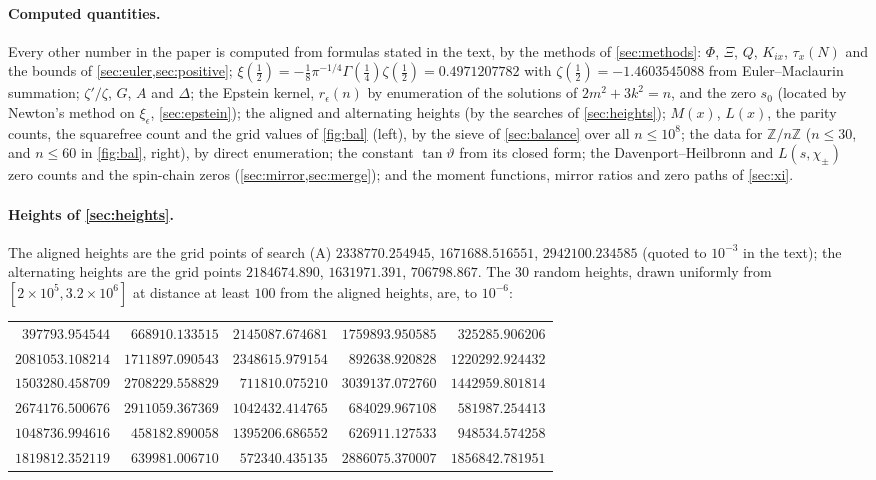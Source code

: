 \documentclass[11pt]{article}
\theoremstyle{definition}\newtheorem{definition}[theorem]{Definition}
\theoremstyle{remark}\newtheorem{remark}[theorem]{Remark}
\begin{document}
\paragraph{Computed quantities.} Every other number in the paper is computed from formulas stated in the text, by the methods of \cref{sec:methods}: $\Phi$, $\Xi$, $Q$, $K_{ix}$, $\tau_x(N)$ and the bounds of \cref{sec:euler,sec:positive}; $\xi(\frac12)=-\frac18\pi^{-1/4}\Gamma(\frac14)\zeta(\frac12)=0.4971207782$ with $\zeta(\frac12)=-1.4603545088$ from Euler--Maclaurin summation; $\zeta'/\zeta$, $G$, $A$ and $\Delta$; the Epstein kernel, $r_\epsilon(n)$ by enumeration of the solutions of $2m^2+3k^2=n$, and the zero $s_0$ (located by Newton's method on $\xi_\epsilon$, \cref{sec:epstein}); the aligned and alternating heights (by the searches of \cref{sec:heights}); $M(x)$, $L(x)$, the parity counts, the squarefree count and the grid values of \cref{fig:bal} (left), by the sieve of \cref{sec:balance} over all $n\le10^8$; the data for $\mathbb Z/n\mathbb Z$ ($n\le30$, and $n\le60$ in \cref{fig:bal}, right), by direct enumeration; the constant $\tan\vartheta$ from its closed form; the Davenport--Heilbronn and $L(s,\chi_{\pm})$ zero counts and the spin-chain zeros (\cref{sec:mirror,sec:merge}); and the moment functions, mirror ratios and zero paths of \cref{sec:xi}.

\paragraph{Heights of \cref{sec:heights}.} The aligned heights are the grid points of search (A) $2338770.254945$, $1671688.516551$, $2942100.234585$ (quoted to $10^{-3}$ in the text); the alternating heights are the grid points $2184674.890$, $1631971.391$, $706798.867$. The 30 random heights, drawn uniformly from $[2\times10^5,3.2\times10^6]$ at distance at least $100$ from the aligned heights, are, to $10^{-6}$:
\begin{center}\small
\begin{tabular}{@{}rrrrr@{}}
$397793.954544$ & $668910.133515$ & $2145087.674681$ & $1759893.950585$ & $325285.906206$\\
$2081053.108214$ & $1711897.090543$ & $2348615.979154$ & $892638.920828$ & $1220292.924432$\\
$1503280.458709$ & $2708229.558829$ & $711810.075210$ & $3039137.072760$ & $1442959.801814$\\
$2674176.500676$ & $2911059.367369$ & $1042432.414765$ & $684029.967108$ & $581987.254413$\\
$1048736.994616$ & $458182.890058$ & $1395206.686552$ & $626911.127533$ & $948534.574258$\\
$1819812.352119$ & $639981.006710$ & $572340.435135$ & $2886075.370007$ & $1856842.781951$\\
\end{tabular}
\end{center}
\end{document}
